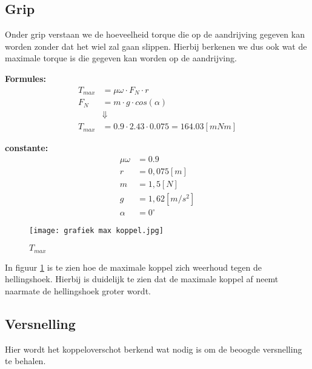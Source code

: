 \subsection{Grip}
    Onder grip verstaan we de hoeveelheid torque die op de aandrijving gegeven kan worden zonder dat het wiel zal gaan slippen. Hierbij berkenen we dus ook wat de maximale torque is die gegeven kan worden op de aandrijving.

    \begin{multicols}{2}
        \textbf{Formules:}
        \begin{equation}
            \begin{split}
                T_{max} &= \mu \omega \cdot F_{N} \cdot r \\
                F_{N} &= m \cdot g \cdot cos(\alpha) \\
                &\Downarrow \\
                T_{max} &= 0.9 \cdot 2.43 \cdot 0.075 = 164.03 [mNm]
            \end{split}
        \end{equation}

        \textbf{constante:}
        \begin{equation*}
            \begin{split}
                \mu \omega &= 0.9 \\
                r &= 0,075 [m] \\
                m &= 1,5 [N] \\
                g &= 1,62 [m/s^2] \\
                \alpha &= 0^\circ 
            \end{split}
        \end{equation*}
    \end{multicols}

    \begin{figure}[H]
        \centering
        \texttt{[image: grafiek max koppel.jpg]}
        \caption{$T_{max}$}
        \label{fig:peanut}
    \end{figure}

    In figuur \ref{fig:peanut} is te zien hoe de maximale koppel zich weerhoud tegen de hellingshoek. Hierbij is duidelijk te zien dat de maximale koppel af neemt naarmate de hellingshoek groter wordt.

\subsection{Versnelling}
    Hier wordt het koppeloverschot berkend wat nodig is om de beoogde versnelling te behalen. 

